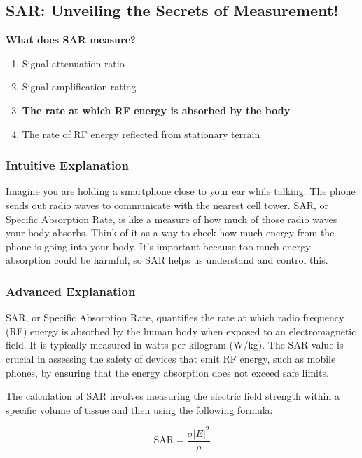 \subsection{SAR: Unveiling the Secrets of Measurement!}

\begin{tcolorbox}[colback=gray!10!white,colframe=black!75!black,title=\textbf{E0A08}]
\textbf{What does SAR measure?}
\begin{enumerate}[label=\Alph*,noitemsep]
    \item Signal attenuation ratio
    \item Signal amplification rating
    \item \textbf{The rate at which RF energy is absorbed by the body}
    \item The rate of RF energy reflected from stationary terrain
\end{enumerate}
\end{tcolorbox}

\subsubsection{Intuitive Explanation}
Imagine you are holding a smartphone close to your ear while talking. The phone sends out radio waves to communicate with the nearest cell tower. SAR, or Specific Absorption Rate, is like a measure of how much of those radio waves your body absorbs. Think of it as a way to check how much energy from the phone is going into your body. It’s important because too much energy absorption could be harmful, so SAR helps us understand and control this.

\subsubsection{Advanced Explanation}
SAR, or Specific Absorption Rate, quantifies the rate at which radio frequency (RF) energy is absorbed by the human body when exposed to an electromagnetic field. It is typically measured in watts per kilogram (W/kg). The SAR value is crucial in assessing the safety of devices that emit RF energy, such as mobile phones, by ensuring that the energy absorption does not exceed safe limits.

The calculation of SAR involves measuring the electric field strength within a specific volume of tissue and then using the following formula:

\[
\text{SAR} = \frac{\sigma |E|^2}{\rho}
\]

